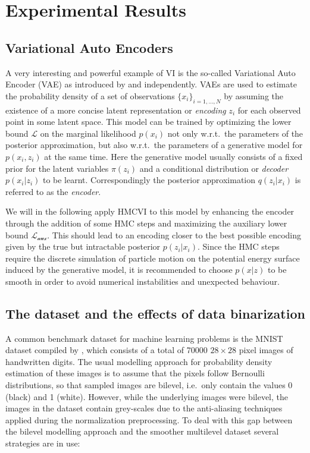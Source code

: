 \section{Experimental Results}
\label{sec:Experiments}
\subsection{Variational Auto Encoders}

A very interesting and powerful example of VI is the so-called Variational Auto Encoder (VAE) as introduced by \parencite{Kingma2014} and \parencite{Rezende2014} independently. VAEs are used to estimate the probability density of a set of observations $\{x_i\}_{i=1, \dots, N}$ by assuming the existence of a more concise latent representation or \textit{encoding} $z_i$ for each observed point in some latent space. This model can be trained by optimizing the lower bound $\mathcal{L}$ on the marginal likelihood $p(x_i)$ not only w.r.t.\ the parameters of the posterior approximation, but also w.r.t.\ the parameters of a generative model for $p(x_i, z_i)$ at the same time. Here the generative model usually consists of a fixed prior for the latent variables $\pi(z_i)$ and a conditional distribution or \textit{decoder} $p(x_i|z_i)$ to be learnt. Correspondingly the posterior approximation $q(z_i|x_i)$ is referred to as the \textit{encoder}.

We will in the following apply HMCVI to this model by enhancing the encoder through the addition of some HMC steps and maximizing the auxiliary lower bound $\mathcal{L_\textrm{aux}}$. This should lead to an encoding closer to the best possible encoding given by the true but intractable posterior $p(z_i|x_i)$. Since the HMC steps require the discrete simulation of particle motion on the potential energy surface induced by the generative model, it is recommended to choose $p(x|z)$ to be smooth in order to avoid numerical instabilities and unexpected behaviour.

\subsection{The dataset and the effects of data binarization}
\label{sec:Dataset}
A common benchmark dataset for machine learning problems is the MNIST dataset compiled by \parencite{LeCun1998}, which consists of a total of 70000 $28 \times 28$ pixel images of handwritten digits. The usual modelling approach for probability density estimation of these images is to assume that the pixels follow Bernoulli distributions, so that sampled images are bilevel, i.e.\ only contain the values 0 (black) and 1 (white). However, while the underlying images were bilevel, the images in the dataset contain grey-scales due to the anti-aliasing techniques applied during the normalization preprocessing. To deal with this gap between the bilevel modelling approach and the smoother multilevel dataset several strategies are in use:

